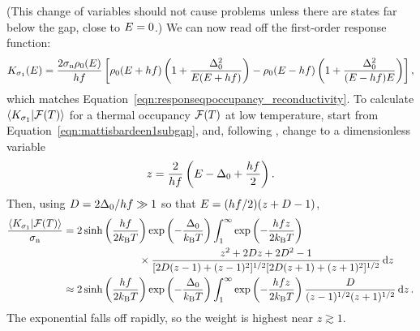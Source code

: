 (This change of variables should not cause problems unless there are states far below the gap, close to $E = 0$.)
We can now read off the first-order response function:
\begin{equation}
K_{\sigma_1}(E)
  =
  \frac{2 \sigma_{\mathrm{n}} \rho_0(E)}{h f}
  \left[
  \rho_0(E + h f)
  \left(1 + \frac{\Delta_0^2}{E (E + h f)} \right)
  - \rho_0(E - h f)
  \left(1 + \frac{\Delta_0^2}{(E - h f) E} \right)
  \right],
\label{eqn:first-order_response.responseqpoccupancy_reconductivity}
\end{equation}
which matches Equation~\ref{eqn:responseqpoccupancy_reconductivity}.
To calculate $\braket{K_{\sigma_1}}{\mathcal{F}(T)}$ for a thermal occupancy  $\mathcal{F}(T)$ at low temperature, start from Equation~\ref{eqn:mattisbardeen1subgap}, and, following \textcite{Barends2009}, change to a dimensionless variable
\begin{equation}
z
  =
  \frac{2}{h f} \left( E - \Delta_0 + \frac{h f}{2} \right).
\end{equation}
Then, using
$D = 2 \Delta_0 / h f \gg 1$
so that
$E = (h f / 2) (z + D - 1)$,
\begin{align}
\begin{split}
\frac{\braket{K_{\sigma_1}}{\mathcal{F}(T)}}{\sigma_{\mathrm{n}}}
  &=
  2 \sinh \left( \frac{h f}{2 k_\mathrm{B} T} \right)
  \exp \left( -\frac{\Delta_0}{k_\mathrm{B} T} \right)
  \int_1^\infty
  \exp \left( -\frac{h f z}{2 k_\mathrm{B} T} \right) \\
  &\hspace{1in} \times  \frac{z^2 + 2 D z + 2 D^2 - 1}{[2 D (z - 1) + (z - 1)^2]^{1/2} [2 D (z + 1) + (z + 1)^2]^{1/2}} \dd{z} \\
  &\approx
  2 \sinh \left( \frac{h f}{2 k_\mathrm{B} T} \right)
  \exp \left( -\frac{\Delta_0}{k_\mathrm{B} T} \right)
  \int_1^\infty
  \exp \left( -\frac{h f z}{2 k_\mathrm{B} T} \right)
  \frac{D}
  {(z - 1)^{1/2} (z + 1)^{1/2}} \dd{z}.
\end{split}
\end{align}
The exponential falls off rapidly, so the weight is highest near $z \gtrsim 1$.
